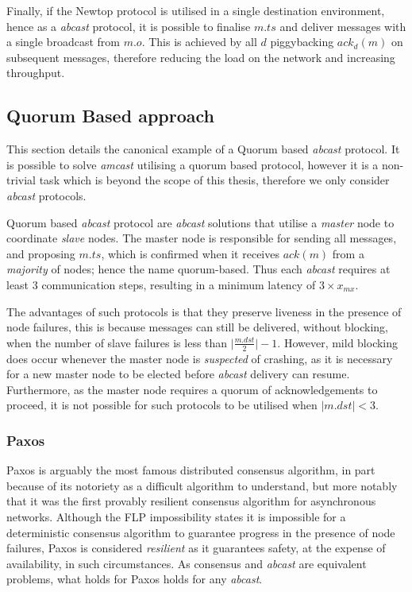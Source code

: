 Finally, if the Newtop protocol is utilised in a single destination environment, hence as a \emph{abcast} protocol, it is possible to finalise $m.ts$ and deliver messages with a single broadcast from $m.o$.  This is achieved by all $d$ piggybacking $ack_d(m)$ on subsequent messages, therefore reducing the load on the network and increasing throughput.  

	\subsection{Quorum Based approach}
	 This section details the canonical example of a Quorum based \emph{abcast} protocol. It is possible to solve \emph{amcast} utilising a quorum based protocol, however it is a non-trivial task which is beyond the scope of this thesis, therefore we only consider \emph{abcast} protocols.  
	 
	Quorum based \emph{abcast} protocol are \emph{abcast} solutions that utilise a \emph{master} node to coordinate \emph{slave} nodes.  The master node is responsible for sending all messages, and proposing $m.ts$, which is confirmed when it receives $ack(m)$ from a \emph{majority} of nodes; hence the name quorum-based.  Thus each \emph{abcast} requires at least 3 communication steps, resulting in a minimum latency of $3 \times x_{mx}$.  
	
	The advantages of such protocols is that they preserve liveness in the presence of node failures, this is because messages can still be delivered, without blocking, when the number of slave failures is less than $\vert \frac{m.dst}{2} \vert - 1$.  However, mild blocking does occur whenever the master node is \emph{suspected} of crashing, as it is necessary for a new master node to be elected before \emph{abcast} delivery can resume. Furthermore, as the master node requires a quorum of acknowledgements to proceed, it is not possible for such protocols to be utilised when $\left\vert m.dst \right\vert < 3$. 
		
		\subsubsection*{Paxos}
		Paxos\citep{Lamport:1998:PP:279227.279229}\citep{Lamport:2001:PaxosMadeSimple} is arguably the most famous distributed consensus algorithm, in part because of its notoriety as a difficult algorithm to understand, but more notably that it was the first provably resilient consensus algorithm for asynchronous networks.  Although the FLP \citep{Fischer:1985:IDC:3149.214121} impossibility states it is impossible for a deterministic consensus algorithm to guarantee progress in the presence of node failures, Paxos is considered \emph{resilient} as it guarantees safety, at the expense of availability, in such circumstances.  As consensus and \emph{abcast} are equivalent problems\citep{Defago:2004:TOB:1041680.1041682}, what holds for Paxos holds for any \emph{abcast}.  
		
